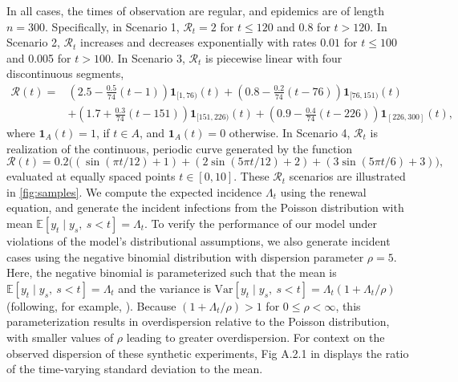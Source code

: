 \documentclass[10pt,letterpaper]{article}
\newcommand{\lr}[1]{\left(#1\right)}
\def\bbE{\mathbb{E}}
\def\calR{\mathcal{R}}
\begin{document}
In all cases, the times of observation are regular, and epidemics are of length
$n=300$. Specifically, in Scenario 1, $\calR_t = 2$ for $t\leq 120$ and 0.8 for $t>120$. In
Scenario 2, $\calR_t$ increases and decreases exponentially with rates $0.01$
for $t\leq 100$ and 0.005 for $t>100$. In Scenario 3, $\calR_t$ is piecewise linear
with four discontinuous segments, 
\begin{equation}
  \begin{split}
    \calR(t) =& \lr{2.5 - \frac{0.5}{74}\lr{t-1}} \boldsymbol{1}_{[1,76)}(t)
     + \lr{0.8 - \frac{0.2}{74}\lr{t-76}} \boldsymbol{1}_{[76,151)}(t) \\
    & + \lr{1.7 + \frac{0.3}{74}\lr{t-151}} \boldsymbol{1}_{[151,226)}(t)
       + \lr{0.9 - \frac{0.4}{74}\lr{t-226}} \boldsymbol{1}_{[226,300]}(t),
  \end{split}
\end{equation}
where $\boldsymbol{1}_{A}(t) = 1$, if $t\in A$, and $\boldsymbol{1}_{A}(t)=0$ otherwise. 
In Scenario 4, $\calR_t$ is realization of the 
continuous, periodic curve generated by the function 
\begin{equation}
  \calR(t) = 0.2 \big(\lr{\sin(\pi t/12) + 1} + \lr{2 \sin\lr{5 \pi t / 12} + 2} 
  + \lr{3 \sin(5\pi t / 6) + 3}\big),
\end{equation} 
evaluated at equally spaced points $t\in [0,10]$. These $\calR_t$ scenarios are
illustrated in \autoref{fig:samples}. We compute the expected incidence
$\Lambda_t$ using the renewal equation, and generate the incident infections
from the Poisson distribution with mean $\bbE[y_t \mid y_s,\ s<t] = \Lambda_t$.
To verify the performance of our model under violations of the model's
distributional assumptions, we also generate incident cases using the negative
binomial distribution with dispersion parameter $\rho = 5$. Here, the negative
binomial is parameterized such that the mean is
$\bbE[y_t\mid y_s,\ s<t] = \Lambda_t$ and the variance is $\textrm{Var}[y_t \mid
y_s,\ s<t] = \Lambda_t(1 +
\Lambda_t / \rho)$ (following, for example, \cite{gressani2022epilps}). Because
$(1 + \Lambda_t / \rho)> 1$ for  $0\leq\rho <\infty$, this parameterization results
in overdispersion relative to the Poisson distribution, with smaller values of
$\rho$ leading to greater overdispersion. For context on the observed dispersion
of these synthetic experiments, Fig A.2.1 in  displays the
ratio of the time-varying standard deviation to the mean. 
\end{document}
